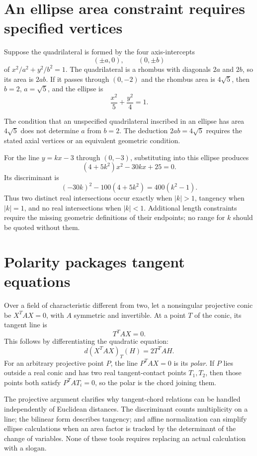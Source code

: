 \section{An ellipse area constraint requires specified vertices}

Suppose the quadrilateral is formed by the four axis-intercepts
\[
 (\pm a,0),\qquad (0,\pm b)
\]
of \(x^2/a^2+y^2/b^2=1\). The quadrilateral is a rhombus with diagonals \(2a\) and \(2b\), so its area is \(2ab\). If it passes through \((0,-2)\) and the rhombus area is \(4\sqrt5\), then \(b=2\), \(a=\sqrt5\), and the ellipse is
\[
 \frac{x^2}{5}+\frac{y^2}{4}=1.
\]

\begin{caution}
The condition that an unspecified quadrilateral inscribed in an ellipse has area \(4\sqrt5\) does not determine \(a\) from \(b=2\). The deduction \(2ab=4\sqrt5\) requires the stated axial vertices or an equivalent geometric condition.
\end{caution}

For the line \(y=kx-3\) through \((0,-3)\), substituting into this ellipse produces
\[
 (4+5k^2)x^2-30kx+25=0.
\]
Its discriminant is
\[
 (-30k)^2-100(4+5k^2)=400(k^2-1).
\]
Thus two distinct real intersections occur exactly when \(|k|>1\), tangency when \(|k|=1\), and no real intersections when \(|k|<1\). Additional length constraints require the missing geometric definitions of their endpoints; no range for \(k\) should be quoted without them.

\section{Polarity packages tangent equations}

Over a field of characteristic different from two, let a nonsingular projective conic be \(X^TAX=0\), with \(A\) symmetric and invertible. At a point \(T\) of the conic, its tangent line is
\[
 T^TAX=0.
\]
This follows by differentiating the quadratic equation:
\[
 d(X^TAX)_T(H)=2T^TAH.
\]
For an arbitrary projective point \(P\), the line \(P^TAX=0\) is its \emph{polar}. If \(P\) lies outside a real conic and has two real tangent-contact points \(T_1,T_2\), then those points both satisfy \(P^TAT_i=0\), so the polar is the chord joining them.

The projective argument clarifies why tangent-chord relations can be handled independently of Euclidean distances. The discriminant counts multiplicity on a line; the bilinear form describes tangency; and affine normalization can simplify ellipse calculations when an area factor is tracked by the determinant of the change of variables. None of these tools requires replacing an actual calculation with a slogan.
